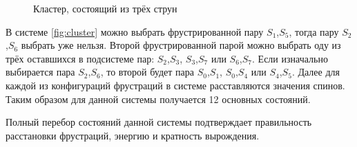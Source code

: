 \documentclass[utf8, babel, sor, jor, amsmath,amssymb, reprint]{elsarticle} %
\begin{document}
\begin{figure}[h]
	\centering
	\caption{Кластер, состоящий из трёх струн}
	\label{fig:cluster}
\end{figure}

В системе \eqref{fig:cluster}  можно выбрать фрустрированной пару $S_1$,$S_5$, тогда пару  $S_2$,$S_6$ выбрать уже нельзя. Второй фрустрированной парой можно выбрать оду из трёх оставшихся в подсистеме пар: $S_2$,$S_3$, $S_3$,$S_7$ или $S_6$,$S_7$. Если изначально выбирается пара $S_2$,$S_6$, то второй будет пара $S_0$,$S_1$, $S_0$,$S_4$ или $S_4$,$S_5$. Далее для каждой из конфигураций фрустраций в системе расставляются значения спинов. Таким образом для данной системы получается 12 основных состояний. 

Полный перебор состояний данной системы подтверждает правильность расстановки фрустраций, энергию и кратность вырождения.
\end{document}
